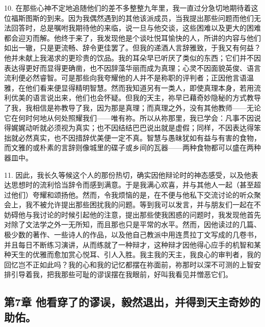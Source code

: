 10. 在那些心神不定地追随他们的差不多整整九年里，我一直过分急切地期待着这位福斯图斯的到来。因为我偶然遇到的其他该派成员，当我提出那些问题而他们无法回答时，总是嘱咐我期待他的来临，说一旦与他交谈，这些困难以及更大的困难都会迎刃而解。他终于来了，我发现他是个谈吐悦耳愉快的人，所讲的内容与他们如出一辙，只是更流畅、辞令更佳罢了。但我的递酒人言辞雅致，于我又有何益？他并未献上我渴求的更珍贵的饮品。我的耳朵早已听厌了类似的东西；它们并不因表达得更好而显得更确凿，也不因辞藻华丽而成为真理；心灵不因面貌英俊、语言流利便必然睿智。可是那些向我夸耀他的人并不是称职的评判者；正因他言语温雅，在他们看来便显得精明智慧。然而我知道另有一类人，即使真理本身，若用流利优美的语言说出来，他们也会怀疑。但我的天主，祢早已藉奇妙隐秘的方式教导了我，我相信是祢教导了我，因为那是真理；而真理之外，没有其他教师——无论它在何时何地从何处照耀我们——唯有祢。所以从祢那里，我已学会：凡事不因说得娓娓动听就必须视为真实；也不因结结巴巴说出就是虚假；同样，不因表达得笨拙就必然真实，也不因措辞优美便一定不真。智慧与愚昧犹如有益与有害的食物，而文雅的或朴素的言辞则像城里的碟子或乡间的瓦器——两种食物都可以盛在两种器皿中。\par

11. 因此，我长久等候这个人的那份热切，确实因他辩论时的神态感受，以及他表达思想时的流利恰当辞令而感到满意。于是我满心欢喜，并与其他人一起（甚至超过他们）夸耀和颂扬他。然而，令我烦恼的是，在不便与他私下交流讨论的听众聚会上，我不被允许提出那些困扰我的问题。等到我可以发言，并与朋友们一起在不妨碍他与我讨论的时候引起他的注意，提出那些使我困惑的问题时，我发现他首先对除了文法学之外一无所知，而且那也只是平常的水平。然而，因他读过的几篇、极少数的著作、一些诗人的作品，以及他自己教派中用连贯拉丁文写成的几卷书，并且每日不断练习演讲，从而练就了一种辩才，这种辩才因他得心应手的机智和某种天生的优雅而愈加赏心悦耳、引人入胜。我主我的天主，我良心的审判者，我的回忆岂不正如此吗？我的心和我的记忆都摆在祢面前，祢那时以深不可测的上智安排引导着我，把我那些可耻的谬误摆在我眼前，好叫我看见并憎恶它们。\par


\subsection{第7章 他看穿了的谬误，毅然退出，并得到天主奇妙的助佑。}

